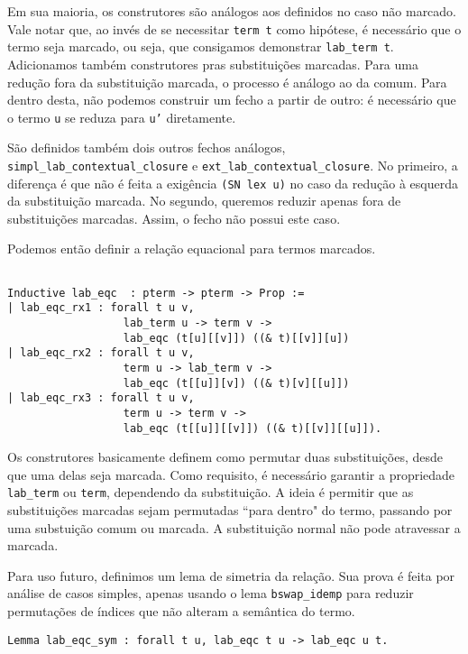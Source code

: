 Em sua maioria, os construtores são análogos aos definidos no caso não marcado.
Vale notar que, ao invés de se necessitar \texttt{term t} como hipótese, é
necessário que o termo seja marcado, ou seja, que consigamos demonstrar
\texttt{lab\_term t}.  Adicionamos também construtores pras substituições
marcadas.  Para uma redução fora da substituição marcada, o processo é análogo
ao da comum.  Para dentro desta, não podemos construir um fecho a partir de
outro: é necessário que o termo \texttt{u} se reduza para \texttt{u'}
diretamente.

São definidos também dois outros fechos análogos,
\texttt{simpl\_lab\_contextual\_closure} e
\texttt{ext\_lab\_contextual\_closure}. No primeiro, a diferença é que não é
feita a exigência \texttt{(SN lex u)} no caso da redução à esquerda da
substituição marcada. No segundo, queremos reduzir apenas fora de substituições
marcadas. Assim, o fecho não possui este caso.


Podemos então definir a relação equacional para termos marcados.

\begin{lstlisting}[basicstyle=\small]
    
Inductive lab_eqc  : pterm -> pterm -> Prop := 
| lab_eqc_rx1 : forall t u v, 
                  lab_term u -> term v -> 
                  lab_eqc (t[u][[v]]) ((& t)[[v]][u]) 
| lab_eqc_rx2 : forall t u v, 
                  term u -> lab_term v -> 
                  lab_eqc (t[[u]][v]) ((& t)[v][[u]]) 
| lab_eqc_rx3 : forall t u v, 
                  term u -> term v -> 
                  lab_eqc (t[[u]][[v]]) ((& t)[[v]][[u]]).
\end{lstlisting}

Os construtores basicamente definem como permutar duas substituições, desde que
uma delas seja marcada. Como requisito, é necessário garantir a propriedade
\texttt{lab\_term} ou \texttt{term}, dependendo da substituição. A ideia é
permitir que as substituições marcadas sejam permutadas ``para dentro" do termo,
passando por uma substuição comum ou marcada. A substituição normal não pode
atravessar a marcada.

Para uso futuro, definimos um lema de simetria da relação. Sua prova é feita por
análise de casos simples, apenas usando o lema \texttt{bswap\_idemp} para
reduzir permutações de índices que não alteram a semântica do termo.

\begin{lstlisting}[basicstyle=\small]
Lemma lab_eqc_sym : forall t u, lab_eqc t u -> lab_eqc u t.
\end{lstlisting}

